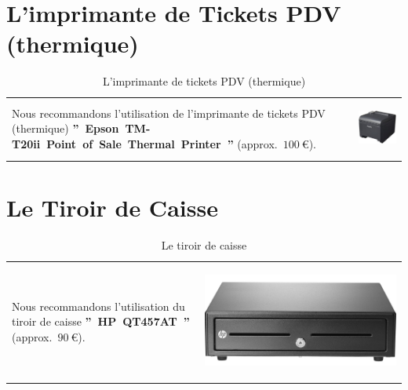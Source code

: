 \documentclass[12pt, a4paper]{article}
\newcommand{\money}[1]{$#1\ \euro{}$\xspace}
\begin{document}
\section{L'imprimante de Tickets PDV (thermique)}
\vspace{-3.2em}

\begin{table}[!htbp]
\begin{tabular}{lr}
\parbox{25em}{
Nous recommandons l'utilisation de 
l'imprimante de tickets PDV (thermique)
\textbf{''~Epson~TM-T20ii~Point~of~Sale~Thermal~Printer~''}
(approx.~\money{100}).
\vspace{-3em}
}

&

\parbox{17em}{
\begin{center}
\includegraphics[scale=0.27]{images/epson-tm-t20-pos-thermal-printer.png}
\caption*{L'imprimante de tickets PDV (thermique)}
\end{center}
}
\end{tabular}
\end{table}

\vspace{0.5em}
\section{Le Tiroir de Caisse}
\vspace{-3.4em}

\begin{table}[!htbp]
\begin{tabular}{lr}
\parbox{25em}{
Nous recommandons l'utilisation du
tiroir de caisse
\textbf{''~HP~QT457AT~''} (approx.~\money{90}).
\vspace{-3em}
}

&

\parbox{17em}{
\begin{center}
\includegraphics[scale=0.07]{images/hp-cash-drawer.png}
\caption*{Le tiroir de caisse}
\end{center}
}
\end{tabular}
\end{table}
\end{document}
